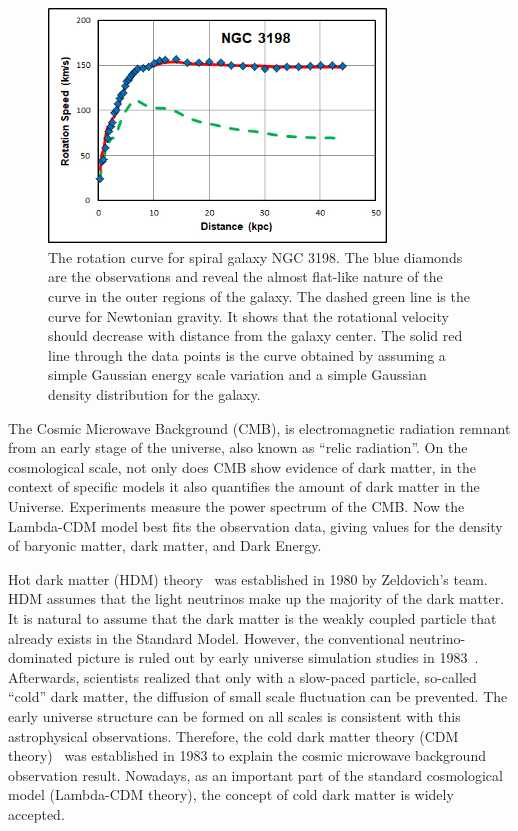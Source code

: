 \begin{figure}[htbp]
    \centering
    \includegraphics[width=0.8\textwidth]{chapters/c2/figures/ngc3198_sparc.jpg}
    \caption{The rotation curve for spiral galaxy NGC 3198. The blue diamonds are the observations and reveal the almost flat-like nature of the curve in the outer regions of the galaxy. The dashed green line is the curve for Newtonian gravity. It shows that the rotational velocity should decrease with distance from the galaxy center. The solid red line through the data points is the curve obtained by assuming a simple Gaussian energy scale variation and a simple Gaussian density distribution for the galaxy.}
    \label{fig:rotation}
\end{figure}

\par The Cosmic Microwave Background (CMB), is electromagnetic radiation remnant from an early stage of the universe, also known as ``relic radiation''. On the cosmological scale, not only does CMB show evidence of dark matter, in the context of specific models it also quantifies the amount of dark matter in the Universe. Experiments measure the power spectrum of the CMB. Now the Lambda-CDM model best fits the observation data, giving values for the density of baryonic matter, dark matter, and Dark Energy.

\par Hot dark matter (HDM) theory~\cite{Zeldovich:1982zz} was established in 1980 by Zeldovich's team. HDM assumes that the light neutrinos make up the majority of the dark matter. It is natural to assume that the dark matter is the weakly coupled particle that already exists in the Standard Model. However, the conventional neutrino-dominated picture is ruled out by early universe simulation studies in 1983~\cite{White:1984yj}. Afterwards, scientists realized that only with a slow-paced particle, so-called ``cold'' dark matter, the diffusion of small scale fluctuation can be prevented. The early universe structure can be formed on all scales is consistent with this astrophysical observations. Therefore, the cold dark matter theory (CDM theory)~\cite{PhysRevLett.48.223} was established in 1983 to explain the cosmic microwave background observation result. Nowadays, as an important part of the standard cosmological model (Lambda-CDM theory), the concept of cold dark matter is widely accepted. 

